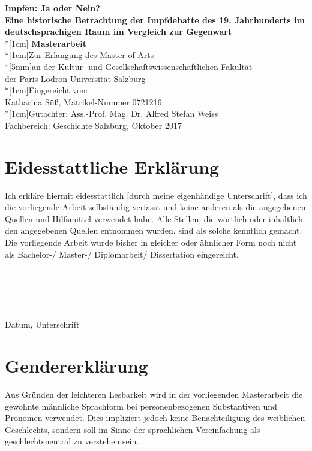 \documentclass[
    a4paper,
    12pt,
    hyphens,
    chapterprefix=true,
    headheight=33pt,
    footheight=29pt,
    headings=optiontohead,
]{scrartcl}
\begin{document}
\thispagestyle{empty}
\begin{center}

\textbf{
{\Large
    Impfen: Ja oder Nein? \\
    Eine historische Betrachtung der Impfdebatte des 19. Jahrhunderts im deutschsprachigen Raum im Vergleich zur Gegenwart
    }
}
\\*[1cm]\Large { \textbf{Masterarbeit}
\\*[1cm]Zur Erlangung des Master of Arts
\\*[5mm]an der Kultur- und Gesellschaftswissenschaftlichen Fakultät
\\der Paris-Lodron-Universität Salzburg
\\*[1cm]Eingereicht von:
\\Katharina Süß, Matrikel-Nummer 0721216
\\*[1cm]Gutachter: Ass.-Prof. Mag. Dr. Alfred Stefan Weiss
\\Fachbereich: Geschichte
\vfill
Salzburg, Oktober 2017
}

\end{center}


\newpage
\tableofcontents
\newpage


\section{Eidesstattliche Erklärung}
Ich erkläre hiermit eidesstattlich [durch meine eigenhändige Unterschrift], dass ich die vorliegende Arbeit selbständig verfasst und keine anderen als die angegebenen Quellen und Hilfsmittel 
verwendet habe. Alle Stellen, die wörtlich oder inhaltlich den angegebenen Quellen entnommen wurden, sind als solche kenntlich gemacht. Die vorliegende Arbeit wurde bisher in gleicher oder ähnlicher Form noch nicht als Bachelor-/ Master-/ Diplomarbeit/ Dissertation eingereicht. \\
\\
\\
\\
\\
\\

Datum, Unterschrift

\newpage
\section{Gendererklärung}
Aus Gründen der leichteren Lesbarkeit wird in der vorliegenden Masterarbeit die gewohnte männliche Sprachform bei personenbezogenen Substantiven und Pronomen verwendet. Dies impliziert jedoch keine Benachteiligung des weiblichen Geschlechts, sondern soll im Sinne der sprachlichen Vereinfachung als geschlechtsneutral zu verstehen sein.
\newpage
\end{document}
